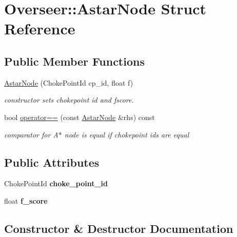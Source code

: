 \hypertarget{structOverseer_1_1AstarNode}{}\section{Overseer\+:\+:Astar\+Node Struct Reference}
\label{structOverseer_1_1AstarNode}
\subsection*{Public Member Functions}
\begin{DoxyCompactItemize}
\item 
\hyperlink{structOverseer_1_1AstarNode_abeb9a0cf86a7b771222d395a69aa2e7c}{Astar\+Node} (Choke\+Point\+Id cp\+\_\+id, float f)
\begin{DoxyCompactList}\small\item\em constructor sets chokepoint id and fscore. \end{DoxyCompactList}\item 
\mbox{\label{structOverseer_1_1AstarNode_a849dc582394a2cde649fefe4becbadf1}} 
bool \hyperlink{structOverseer_1_1AstarNode_a849dc582394a2cde649fefe4becbadf1}{operator==} (const \hyperlink{structOverseer_1_1AstarNode}{Astar\+Node} \&rhs) const
\begin{DoxyCompactList}\small\item\em comparator for A$\ast$ node is equal if chokepoint ids are equal \end{DoxyCompactList}\end{DoxyCompactItemize}
\subsection*{Public Attributes}
\begin{DoxyCompactItemize}
\item 
\mbox{\label{structOverseer_1_1AstarNode_adb7077fecd9a300be97aff01d92f2130}} 
Choke\+Point\+Id {\bfseries choke\+\_\+point\+\_\+id}
\item 
\mbox{\label{structOverseer_1_1AstarNode_a7f6f3bf14073054d12d992b84d0ed035}} 
float {\bfseries f\+\_\+score}
\end{DoxyCompactItemize}


\subsection{Constructor \& Destructor Documentation}
\mbox{\label{structOverseer_1_1AstarNode_abeb9a0cf86a7b771222d395a69aa2e7c}} 
